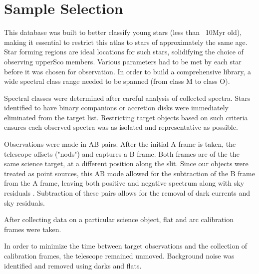 \section{Sample Selection}

This database was built to better classify young stars (less than ~10Myr old), making it essential to restrict this atlas to stars of approximately the same age.  
Star forming regions are ideal locations for such stars, solidifying the choice of observing upperSco members.  Various parameters had to be met by each star before it was chosen for observation.  In order to build a comprehensive library, a wide spectral class range needed to be spanned (from class M to class O).  




Spectral classes were determined after careful analysis of collected spectra.  Stars identified to have binary companions \cite{binary_guy} or accretion disks \cite{binary_guy} were immediately eliminated from the target list.
Restricting target objects based on such criteria ensures each observed spectra was as isolated and representative as possible.


Observations were made in AB pairs.  After the initial A frame is taken, the telescope offsets ("nods") and captures a B frame.  Both frames are of the the same science target, at a different position along the slit.  Since our objects were treated as point sources, this AB mode allowed for the subtraction of the B frame from the A frame, leaving both positive and negative spectrum along with sky residuals \cite{Cushing_2004}. Subtraction of these pairs allows for the removal of dark currents and sky residuals.



After collecting data on a particular science object, flat and arc calibration frames were taken.  

In order to minimize the time between target observations and the collection of calibration frames, the telescope remained unmoved.  Background noise was identified and removed using darks and flats.